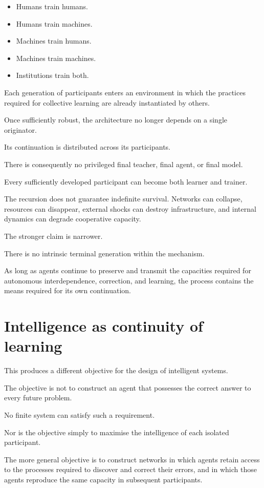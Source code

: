 \documentclass[11pt, a4paper]{article}
\begin{document}
\begin{itemize}[leftmargin=*]
    \item Humans train humans.
    \item Humans train machines.
    \item Machines train humans.
    \item Machines train machines.
    \item Institutions train both.
\end{itemize}

Each generation of participants enters an environment in which the practices required for collective learning are already instantiated by others.

Once sufficiently robust, the architecture no longer depends on a single originator.

Its continuation is distributed across its participants.

There is consequently no privileged final teacher, final agent, or final model.

Every sufficiently developed participant can become both learner and trainer.

The recursion does not guarantee indefinite survival. Networks can collapse, resources can disappear, external shocks can destroy infrastructure, and internal dynamics can degrade cooperative capacity.

The stronger claim is narrower.

There is no intrinsic terminal generation within the mechanism.

As long as agents continue to preserve and transmit the capacities required for autonomous interdependence, correction, and learning, the process contains the means required for its own continuation.

\section{Intelligence as continuity of learning}
This produces a different objective for the design of intelligent systems.

The objective is not to construct an agent that possesses the correct answer to every future problem.

No finite system can satisfy such a requirement.

Nor is the objective simply to maximise the intelligence of each isolated participant.

The more general objective is to construct networks in which agents retain access to the processes required to discover and correct their errors, and in which those agents reproduce the same capacity in subsequent participants.
\end{document}
